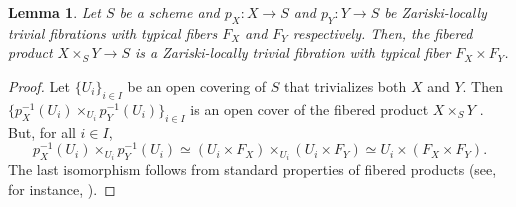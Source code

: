 \documentclass{amsart}
\theoremstyle{plain}
\newtheorem{lemma}[theorem]{Lemma}
\numberwithin{equation}{section}
\theoremstyle{definition}
\theoremstyle{remark}
\begin{document}
	\begin{lemma}\label{fiberProductOfZariskiLocallyTrivialFibrationsIsZariskiLocallyTrivial}
		Let $S$ be a scheme and $p_X:X\to S$ and $p_Y:Y\to S$ be Zariski-locally trivial fibrations with typical fibers $F_X$ and $F_Y$ respectively. Then, the fibered product $X\times_SY\to S$ is a Zariski-locally trivial fibration with typical fiber $F_X\times F_Y$. 
	\end{lemma}
	\begin{proof}
		Let $\{U_i\}_{i\in I}$ be an open covering of $S$ that trivializes both $X$ and $Y$. Then $\{p_X^{-1}(U_i)\times_{U_i}p_Y^{-1}(U_i)\}_{i\in I}$ is an open cover of the fibered product $X\times_S Y$ \cite[Corollary 4.19]{GortzWedhornAG}.  But, for all $i\in I$, 
		$$
		p_X^{-1}(U_i)\times_{U_i}p_Y^{-1}(U_i)\simeq (U_i\times F_X)\times_{U_i}(U_i\times F_Y)\simeq U_i\times (F_X\times F_Y).
		$$
		The last isomorphism follows from standard properties of fibered products (see, for instance, \cite[Chapter 3, Proposition 1.4]{LiuAG}).
	\end{proof}
\end{document}
